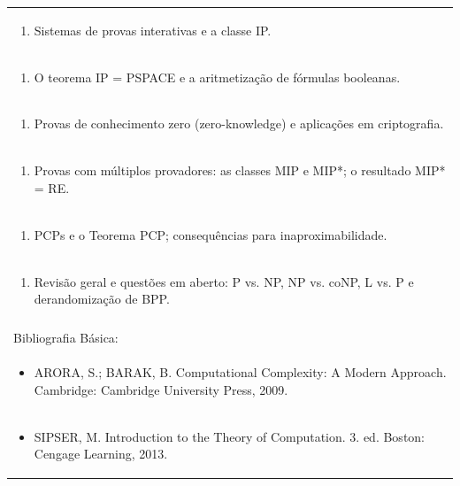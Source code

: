 \documentclass[11pt]{article}
\begin{document}
\begin{center}
\begin{longtable}{|p{4cm}|p{4cm}|p{4cm}|p{4cm}|}
\multicolumn{4}{|p{\dimexpr 16cm + 6\tabcolsep\relax}|}{\begin{enumerate}[start=24]\item Sistemas de provas interativas e a classe IP.\end{enumerate}}\\
\multicolumn{4}{|p{\dimexpr 16cm + 6\tabcolsep\relax}|}{\begin{enumerate}[start=25]\item O teorema IP = PSPACE e a aritmetização de fórmulas booleanas.\end{enumerate}}\\
\multicolumn{4}{|p{\dimexpr 16cm + 6\tabcolsep\relax}|}{\begin{enumerate}[start=26]\item Provas de conhecimento zero (zero-knowledge) e aplicações em criptografia.\end{enumerate}}\\
\multicolumn{4}{|p{\dimexpr 16cm + 6\tabcolsep\relax}|}{\begin{enumerate}[start=27]\item Provas com múltiplos provadores: as classes MIP e MIP*; o resultado MIP* = RE.\end{enumerate}}\\
\multicolumn{4}{|p{\dimexpr 16cm + 6\tabcolsep\relax}|}{\begin{enumerate}[start=28]\item PCPs e o Teorema PCP; consequências para inaproximabilidade.\end{enumerate}}\\
\multicolumn{4}{|p{\dimexpr 16cm + 6\tabcolsep\relax}|}{\begin{enumerate}[start=29]\item Revisão geral e questões em aberto: P vs. NP, NP vs. coNP, L vs. P e derandomização de BPP.\end{enumerate}}\\
\multicolumn{4}{|p{\dimexpr 16cm + 6\tabcolsep\relax}|}{}\\
\hline
\multicolumn{4}{|p{16cm}|}{Bibliografia Básica:}\\*
\multicolumn{4}{|p{\dimexpr 16cm + 6\tabcolsep\relax}|}{\begin{itemize}\item ARORA, S.; BARAK, B. Computational Complexity: A Modern Approach. Cambridge: Cambridge University Press, 2009.\end{itemize}}\\
\multicolumn{4}{|p{\dimexpr 16cm + 6\tabcolsep\relax}|}{\begin{itemize}\item SIPSER, M. Introduction to the Theory of Computation. 3. ed. Boston: Cengage Learning, 2013.\end{itemize}}\\

\end{longtable}
\end{center}
\end{document}

